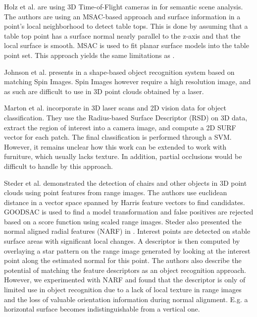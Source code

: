 \documentclass[letterpaper, 10pt, conference]{ieeeconf}
\begin{document}
Holz et al. are using 3D Time-of-Flight cameras in \cite{Holz2010} for semantic scene analysis. The authors are using an MSAC-based approach and surface information in a point's local neighborhood to detect table tops. This is done by assuming that a table top point has a surface normal nearly parallel to the z-axis and that the local surface is smooth. MSAC is used to fit planar surface models into the table point set. This approach yields the same limitations as \cite{Blodow2007}.


Johnson et al. presents in \cite{Johnson2002} a shape-based object recognition system based on matching Spin Images. Spin Images however require a high resolution image, and as such are difficult to use in 3D point clouds obtained by a laser.


Marton et al. incorporate in \cite{Marton} 3D laser scans and 2D vision data for object classification. They use the Radius-based Surface Descriptor (RSD) on 3D data, extract the region of interest into a camera image, and compute a 2D SURF vector for each patch. The final classification is performed through a SVM. However, it remains unclear how this work can be extended to work with furniture, which usually lacks texture. In addition, partial occlusions would be difficult to handle by this approach. %


Steder et al. \cite{Steder2009} demonstrated the detection of chairs and other objects in 3D point clouds using point features from range images. The authors use euclidean distance in a vector space spanned by Harris feature vectors to find candidates. GOODSAC is used to find a model transformation and false positives are rejected based on a score function using scaled range images. Steder also presented the normal aligned radial features (NARF) in  \cite{Steder2010}. Interest points are detected on stable surface areas with significant local changes. A descriptor is then computed by overlaying a star pattern on the range image generated by looking at the interest point along the estimated normal for this point. The authors also describe the potential of matching the feature descriptors as an object recognition approach. However, we experimented with NARF and found that the descriptor is only of limited use in object recognition due to a lack of local texture in range images and the loss of valuable orientation information during normal alignment. E.g. a horizontal surface becomes indistinguishable from a vertical one.
\end{document}
